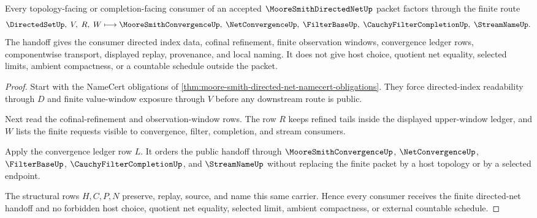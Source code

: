\begin{theorem}\label{thm:moore-smith-directed-net-finite-window-handoff}
Every topology-facing or completion-facing consumer of an accepted $\MooreSmithDirectedNetUp$ packet factors through the finite route
$$
\DirectedSetUp,\; V,\; R,\; W
\longmapsto
\MooreSmithConvergenceUp,\;\NetConvergenceUp,\;\FilterBaseUp,\;\CauchyFilterCompletionUp,\;\StreamNameUp .
$$
The handoff gives the consumer directed index data, cofinal refinement, finite observation windows, convergence ledger rows, componentwise transport, displayed replay, provenance, and local naming. It does not give host choice, quotient net equality, selected limits, ambient compactness, or a countable schedule outside the packet.
\end{theorem}
\begin{proof}
Start with the NameCert obligations of \autoref{thm:moore-smith-directed-net-namecert-obligations}. They force directed-index readability through $D$ and finite value-window exposure through $V$ before any downstream route is public.

Next read the cofinal-refinement and observation-window rows. The row $R$ keeps refined tails inside the displayed upper-window ledger, and $W$ lists the finite requests visible to convergence, filter, completion, and stream consumers.

Apply the convergence ledger row $L$. It orders the public handoff through $\MooreSmithConvergenceUp$, $\NetConvergenceUp$, $\FilterBaseUp$, $\CauchyFilterCompletionUp$, and $\StreamNameUp$ without replacing the finite packet by a host topology or by a selected endpoint.

The structural rows $H,C,P,N$ preserve, replay, source, and name this same carrier. Hence every consumer receives the finite directed-net handoff and no forbidden host choice, quotient net equality, selected limit, ambient compactness, or external countable schedule.
\end{proof}



